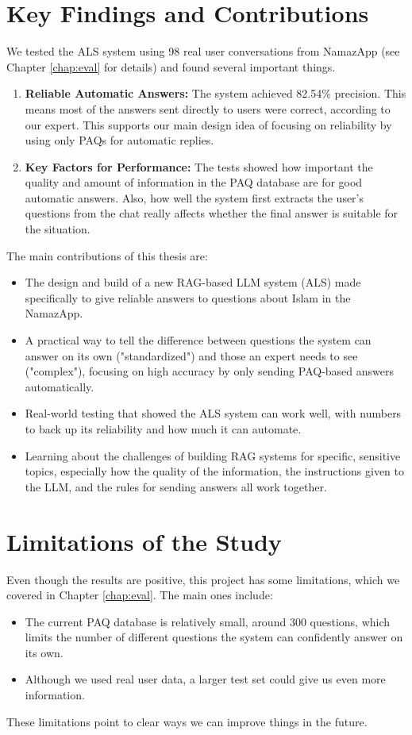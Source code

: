 \section{Key Findings and Contributions}
\label{sec:key_findings_and_contributions}
We tested the ALS system using 98 real user conversations from NamazApp (see Chapter \ref{chap:eval} for details) and found several important things.
\begin{enumerate}
\item \textbf{Reliable Automatic Answers:} The system achieved 82.54\% precision. This means most of the answers sent directly to users were correct, according to our expert. This supports our main design idea of focusing on reliability by using only PAQs for automatic replies.
\item \textbf{Key Factors for Performance:} The tests showed how important the quality and amount of information in the PAQ database are for good automatic answers. Also, how well the system first extracts the user's questions from the chat really affects whether the final answer is suitable for the situation.
\end{enumerate}
The main contributions of this thesis are:
\begin{itemize}
\item The design and build of a new RAG-based LLM system (ALS) made specifically to give reliable answers to questions about Islam in the NamazApp.
\item A practical way to tell the difference between questions the system can answer on its own ("standardized") and those an expert needs to see ("complex"), focusing on high accuracy by only sending PAQ-based answers automatically.
\item Real-world testing that showed the ALS system can work well, with numbers to back up its reliability and how much it can automate.
\item Learning about the challenges of building RAG systems for specific, sensitive topics, especially how the quality of the information, the instructions given to the LLM, and the rules for sending answers all work together.
\end{itemize}
\section{Limitations of the Study}
\label{sec:conc_limitations}
Even though the results are positive, this project has some limitations, which we covered in Chapter \ref{chap:eval}. The main ones include:
\begin{itemize}
\item The current PAQ database is relatively small, around 300 questions, which limits the number of different questions the system can confidently answer on its own.
\item Although we used real user data, a larger test set could give us even more information.
\end{itemize}
These limitations point to clear ways we can improve things in the future.
